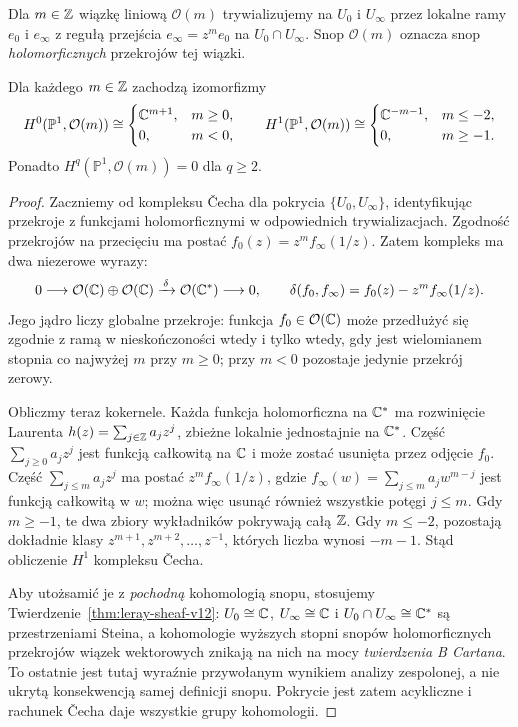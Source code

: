 \begin{definicja}
Dla $m\in\mathbb{Z}$ wiązkę liniową $\mathcal O(m)$
trywializujemy na $U_0$ i $U_\infty$ przez
lokalne ramy $e_0$ i $e_\infty$ z regułą przejścia
$e_\infty=z^m e_0$ na $U_0\cap U_\infty$.
Snop $\mathcal O(m)$ oznacza snop \emph{holomorficznych}
przekrojów tej wiązki.
\end{definicja}

\begin{twierdzenie}
\label{thm:p1-twist-v12}
Dla każdego $m\in\mathbb{Z}$ zachodzą izomorfizmy
\[
H^0(\mathbb P^1,\mathcal O(m))\cong
\begin{cases}\mathbb{C}^{m+1},&m\ge0,\\0,&m<0,\end{cases}
\qquad
H^1(\mathbb P^1,\mathcal O(m))\cong
\begin{cases}\mathbb{C}^{-m-1},&m\le-2,\\0,&m\ge-1.\end{cases}
\]
Ponadto $H^q(\mathbb P^1,\mathcal O(m))=0$ dla $q\ge2$.
\end{twierdzenie}
\begin{proof}
Zaczniemy od kompleksu \v{C}echa dla pokrycia
$\{U_0,U_\infty\}$, identyfikując przekroje z funkcjami
holomorficznymi w odpowiednich trywializacjach.
Zgodność przekrojów na przecięciu ma postać
$f_0(z)=z^m f_\infty(1/z)$.
Zatem kompleks ma dwa niezerowe wyrazy:
\[
0\longrightarrow
\mathcal O(\mathbb{C})\oplus\mathcal O(\mathbb{C})
\xrightarrow{\,\delta\,}\mathcal O(\mathbb{C}^*)
\longrightarrow0,
\qquad
\delta(f_0,f_\infty)=f_0(z)-z^m f_\infty(1/z).
\]
Jego jądro liczy globalne przekroje: funkcja
$f_0\in\mathcal O(\mathbb{C})$ może przedłużyć się zgodnie
z ramą w nieskończoności wtedy i tylko wtedy,
gdy jest wielomianem stopnia co najwyżej $m$ przy $m\ge0$;
przy $m<0$ pozostaje jedynie przekrój zerowy.

Obliczmy teraz kokernele. Każda funkcja holomorficzna
na $\mathbb{C}^*$ ma rozwinięcie Laurenta
$h(z)=\sum_{j\in\mathbb{Z}}a_jz^j$, zbieżne lokalnie jednostajnie
na $\mathbb{C}^*$. Część $\sum_{j\ge0}a_jz^j$ jest funkcją
całkowitą na $\mathbb{C}$ i może zostać usunięta przez
odjęcie $f_0$. Część $\sum_{j\le m}a_jz^j$
ma postać $z^m f_\infty(1/z)$, gdzie
$f_\infty(w)=\sum_{j\le m}a_jw^{m-j}$ jest
funkcją całkowitą w $w$; można więc usunąć również
wszystkie potęgi $j\le m$. Gdy $m\ge-1$, te dwa
zbiory wykładników pokrywają całą $\mathbb{Z}$.
Gdy $m\le-2$, pozostają dokładnie klasy
$z^{m+1},z^{m+2},\ldots,z^{-1}$, których liczba wynosi
$-m-1$. Stąd obliczenie $H^1$ kompleksu \v{C}echa.

Aby utożsamić je z \emph{pochodną} kohomologią snopu,
stosujemy Twierdzenie~\ref{thm:leray-sheaf-v12}:
$U_0\cong\mathbb{C}$, $U_\infty\cong\mathbb{C}$ i
$U_0\cap U_\infty\cong\mathbb{C}^*$ są przestrzeniami Steina,
a kohomologie wyższych stopni snopów holomorficznych
przekrojów wiązek wektorowych znikają na nich
na mocy \emph{twierdzenia B Cartana}. To ostatnie
jest tutaj wyraźnie przywołanym wynikiem analizy
zespolonej, a nie ukrytą konsekwencją samej definicji
snopu. Pokrycie jest zatem acykliczne i rachunek
\v{C}echa daje wszystkie grupy kohomologii.
\end{proof}

